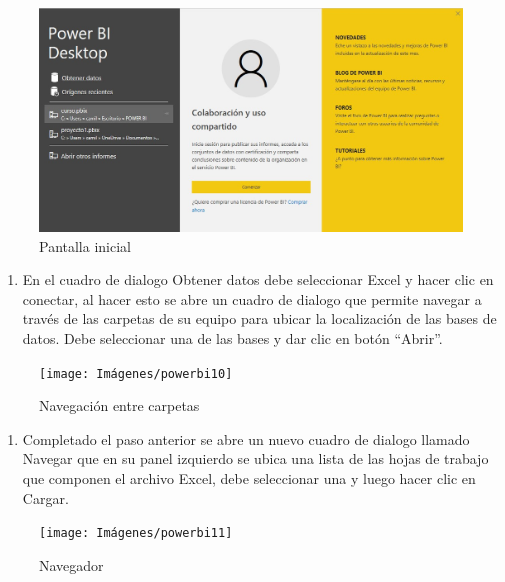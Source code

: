 \documentclass[
]{book}
\providecommand{\tightlist}{%
  \setlength{\itemsep}{0pt}\setlength{\parskip}{0pt}}
\begin{document}
\begin{figure}

{\centering \includegraphics[width=0.8\linewidth]{Imágenes/powerbi9} 

}

\caption{Pantalla inicial}\label{fig:conexiondatos1-fig}
\end{figure}

\begin{enumerate}
\def\labelenumi{\arabic{enumi}.}
\setcounter{enumi}{1}
\tightlist
\item
  En el cuadro de dialogo Obtener datos debe seleccionar Excel y hacer clic en conectar, al hacer esto se abre un cuadro de dialogo que permite navegar a través de las carpetas de su equipo para ubicar la localización de las bases de datos. Debe seleccionar una de las bases y dar clic en botón ``Abrir''.
\end{enumerate}

\begin{figure}

{\centering \texttt{[image: Imágenes/powerbi10]} 

}

\caption{Navegación entre carpetas}\label{fig:conexiondatos2-fig}
\end{figure}

\begin{enumerate}
\def\labelenumi{\arabic{enumi}.}
\setcounter{enumi}{2}
\tightlist
\item
  Completado el paso anterior se abre un nuevo cuadro de dialogo llamado Navegar que en su panel izquierdo se ubica una lista de las hojas de trabajo que componen el archivo Excel, debe seleccionar una y luego hacer clic en Cargar.
\end{enumerate}

\begin{figure}

{\centering \texttt{[image: Imágenes/powerbi11]} 

}

\caption{Navegador}\label{fig:conexiondatos3-fig}
\end{figure}
\end{document}
